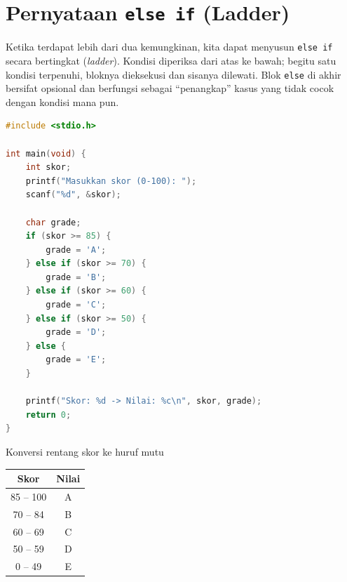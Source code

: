 \documentclass[../main.tex]{subfiles}
\begin{document}


\section{Pernyataan \texttt{else if} (Ladder)}

Ketika terdapat lebih dari dua kemungkinan, kita dapat menyusun \texttt{else if} secara bertingkat (\textit{ladder}). Kondisi diperiksa dari atas ke bawah; begitu satu kondisi terpenuhi, bloknya dieksekusi dan sisanya dilewati. Blok \texttt{else} di akhir bersifat opsional dan berfungsi sebagai ``penangkap'' kasus yang tidak cocok dengan kondisi mana pun.

\begin{lstlisting}[language=C,caption=Klasifikasi nilai dengan \texttt{else if}]
#include <stdio.h>

int main(void) {
    int skor;
    printf("Masukkan skor (0-100): ");
    scanf("%d", &skor);
    
    char grade;
    if (skor >= 85) {
        grade = 'A';
    } else if (skor >= 70) {
        grade = 'B';
    } else if (skor >= 60) {
        grade = 'C';
    } else if (skor >= 50) {
        grade = 'D';
    } else {
        grade = 'E';
    }
    
    printf("Skor: %d -> Nilai: %c\n", skor, grade);
    return 0;
}
\end{lstlisting}

\begin{modultable}[]{Konversi rentang skor ke huruf mutu}
\begin{tabular}{|c|c|}
\hline
\textbf{Skor} & \textbf{Nilai} \\
\hline
85 -- 100 & A \\
\hline
70 -- 84 & B \\
\hline
60 -- 69 & C \\
\hline
50 -- 59 & D \\
\hline
0 -- 49 & E \\
\hline
\end{tabular}
\end{modultable}


\end{document}
